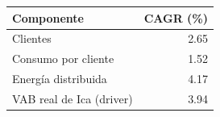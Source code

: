 
\begin{tabular}{lr}
\toprule
Componente & CAGR (\%)\\
\midrule
Clientes & 2.65\\
Consumo por cliente & 1.52\\
Energía distribuida & 4.17\\
VAB real de Ica (driver) & 3.94\\
\bottomrule
\end{tabular}
